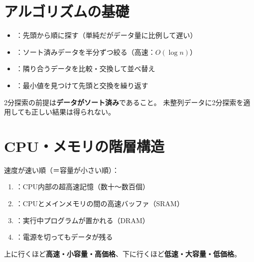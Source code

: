 \section{アルゴリズムの基礎}

\begin{teigi}[基本的なアルゴリズム]
\begin{itemize}
  \item {}：先頭から順に探す（単純だがデータ量に比例して遅い）
  \item {}：ソート済みデータを半分ずつ絞る（高速：$O(\log n)$）
  \item {}：隣り合うデータを比較・交換して並べ替え
  \item {}：最小値を見つけて先頭と交換を繰り返す
\end{itemize}
\end{teigi}

\begin{pitfall}
2分探索の前提は\textbf{データがソート済み}であること。
未整列データに2分探索を適用しても正しい結果は得られない。
\end{pitfall}

\section{CPU・メモリの階層構造}

\begin{teigi}[記憶装置の階層]
速度が速い順（＝容量が小さい順）：
\begin{enumerate}
  \item {}：CPU内部の超高速記憶（数十〜数百個）
  \item {}：CPUとメインメモリの間の高速バッファ（SRAM）
  \item {}：実行中プログラムが置かれる（DRAM）
  \item {}：電源を切ってもデータが残る
\end{enumerate}
上に行くほど\textbf{高速・小容量・高価格}、下に行くほど\textbf{低速・大容量・低価格}。
\end{teigi}

\begin{hikaku}[SRAMとDRAM]
\end{hikaku}

